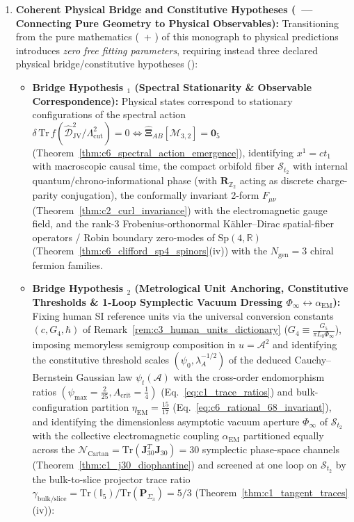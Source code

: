 \documentclass[11pt,a4paper]{article}
\newcommand{\catA}{\text{\textbf{\textcolor{purple!80!black}{[A]}}}}
\newcommand{\catD}{\text{\textbf{\textcolor{blue!75!black}{[D]}}}}
\newcommand{\catH}{\text{\textbf{\textcolor{orange!80!black}{[H]}}}}
\theoremstyle{definition}
\theoremstyle{plain}
\theoremstyle{remark}
\begin{document}
\begin{enumerate}[label=\arabic*.]
  \item \textbf{Coherent Physical Bridge and Constitutive Hypotheses (\catH\ --- Connecting Pure Geometry to Physical Observables):}
  Transitioning from the pure mathematics (\catA\ + \catD) of this monograph to physical predictions introduces \emph{zero free fitting parameters}, requiring instead three declared physical bridge/constitutive hypotheses (\catH):
  \begin{itemize}[leftmargin=1.1cm]
    \item \textbf{Bridge Hypothesis \catH$_1$ (Spectral Stationarity \& Observable Correspondence):} Physical states correspond to stationary configurations of the spectral action $\delta\,\mathrm{Tr}\,f(\widehat{\mathcal{D}}_{\mathrm{JV}}^2/\Lambda_{\mathrm{cut}}^2) = 0 \Longleftrightarrow \widehat{\mathbf{\Xi}}_{AB}[\mathcal{M}_{3,2}] = \mathbf{0}_5$ (Theorem~\ref{thm:c6_spectral_action_emergence}), identifying $x^1 = c t_1$ with macroscopic causal time, the compact orbifold fiber $\mathcal{S}_{t_2}$ with internal quantum/chrono-informational phase (with $\mathbf{R}_{\mathbb{Z}_2}$ acting as discrete charge-parity conjugation), the conformally invariant 2-form $F_{\mu\nu}$ (Theorem~\ref{thm:c2_curl_invariance}) with the electromagnetic gauge field, and the rank-$3$ Frobenius-orthonormal K\"ahler--Dirac spatial-fiber operators / Robin boundary zero-modes of $\mathrm{Sp}(4,\mathbb{R})$ (Theorem~\ref{thm:c6_clifford_sp4_spinors}(iv)) with the $N_{\mathrm{gen}} = 3$ chiral fermion families.
    \item \textbf{Bridge Hypothesis \catH$_2$ (Metrological Unit Anchoring, Constitutive Thresholds \& 1-Loop Symplectic Vacuum Dressing $\Phi_\infty \leftrightarrow \alpha_{\mathrm{EM}}$):} Fixing human SI reference units via the universal conversion constants $(c, G_4, \hbar)$ of Remark~\ref{rem:c3_human_units_dictionary} ($G_4 \equiv \frac{G_5}{\pi L_0\Phi_\infty}$), imposing memoryless semigroup composition in $u = \mathcal{A}^2$ and identifying the constitutive threshold scales $(\psi_0, \lambda_A^{-1/2})$ of the deduced Cauchy--Bernstein Gaussian law $\psi_t(\mathcal{A})$ with the cross-order endomorphism ratios $(\psi_{\max} = \frac{2}{25}, A_{\mathrm{crit}} = \frac{1}{4})$ (Eq.~\ref{eq:c1_trace_ratios}) and bulk-configuration partition $\eta_{\mathrm{EM}} = \frac{15}{17}$ (Eq.~\ref{eq:c6_rational_68_invariant}), and identifying the dimensionless asymptotic vacuum aperture $\Phi_\infty$ of $\mathcal{S}_{t_2}$ with the collective electromagnetic coupling $\alpha_{\mathrm{EM}}$ partitioned equally across the $\mathcal{N}_{\mathrm{Cartan}} = \mathrm{Tr}(\mathbf{J}_{30}^T\mathbf{J}_{30}) = 30$ symplectic phase-space channels (Theorem~\ref{thm:c1_j30_diophantine}) and screened at one loop on $\mathcal{S}_{t_2}$ by the bulk-to-slice projector trace ratio $\gamma_{\mathrm{bulk/slice}} = \mathrm{Tr}(\mathbb{I}_5)/\mathrm{Tr}(\mathbf{P}_{\Sigma_3}) = 5/3$ (Theorem~\ref{thm:c1_tangent_traces}(iv)):

\end{itemize}
\end{enumerate}
\end{document}

